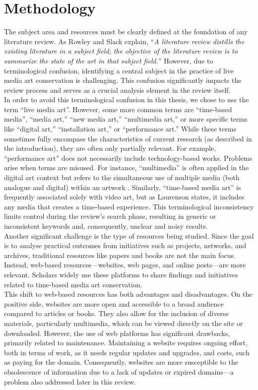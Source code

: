 \section{Methodology}
The subject area and resources must be clearly defined at the foundation of any literature review. As Rowley and Slack \cite{rowley2004conducting} explain, ``\textit{A literature review distills the existing literature in a subject field; the objective of the literature review is to summarize the state of the art in that subject field.}” However, due to terminological confusion, identifying a central subject in the practice of live media art conservation is challenging. This confusion significantly impacts the review process and serves as a crucial analysis element in the review itself.\\
In order to avoid this terminological confusion in this thesis, we chose to use the term ``live media art''. However, some more common terms are ``time-based media'', ``media art,'' ``new media art,'' ``multimedia art,'' or more specific terms like ``digital art,'' ``installation art,'' or ``performance art.'' While these terms sometimes fully encompass the characteristics of current research (as described in the introduction), they are often only partially relevant. For example, ``performance art'' does not necessarily include technology-based works. Problems arise when terms are misused. For instance, ``multimedia'' is often applied in the digital art context but refers to the simultaneous use of multiple media (both analogue and digital) within an artwork \cite{friedman2023intermedia}. Similarly, ``time-based media art'' is frequently associated solely with video art, but as Laurenson \cite{laurenson2001developing} states, it includes any media that creates a time-based experience. This terminological inconsistency limits control during the review’s search phase, resulting in generic or inconsistent keywords and, consequently, unclear and noisy results.\\
Another significant challenge is the type of resources being studied. Since the goal is to analyse practical outcomes from initiatives such as projects, networks, and archives, traditional resources like papers and books are not the main focus. Instead, web-based resources—websites, web pages, and online posts—are more relevant. Scholars widely use these platforms to share findings and initiatives related to time-based media art conservation.\\
This shift to web-based resources has both advantages and disadvantages. On the positive side, websites are more open and accessible to a broad audience compared to articles or books. They also allow for the inclusion of diverse materials, particularly multimedia, which can be viewed directly on the site or downloaded. However, the use of web platforms has significant drawbacks, primarily related to maintenance. Maintaining a website requires ongoing effort, both in terms of work, as it needs regular updates and upgrades, and costs, such as paying for the domain. Consequently, websites are more susceptible to the obsolescence of information due to a lack of updates or expired domains—a problem also addressed later in this review.

